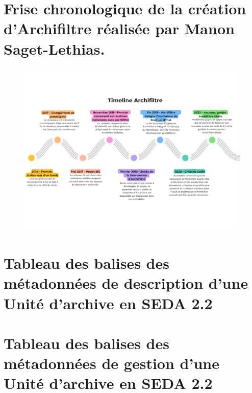 \documentclass[a4paper,12pt,twoside]{book}
\begin{document}
	\chapter[Frise chronologique Archifiltre]{Frise chronologique de la création d’Archifiltre réalisée par Manon Saget-Lethias.}
	\begin{landscape}
		\begin{figure}[h]
			\centering
			\includegraphics[scale=0.45]{annexes/annexe1.png}
			\label{annexe1}
		\end{figure}
	\end{landscape}
	
	\chapter[Balises métadonnées de description]{Tableau des balises des métadonnées de description d'une Unité d'archive en SEDA 2.2}

	\begin{landscape}
		
	\end{landscape}
	\label{annexeb}
	
	\chapter[Balises métadonnées de gestion]{Tableau des balises des métadonnées de gestion d'une Unité d'archive en SEDA 2.2}
	\begin{landscape}
		
	\end{landscape}
	\label{annexec}
\end{document}
